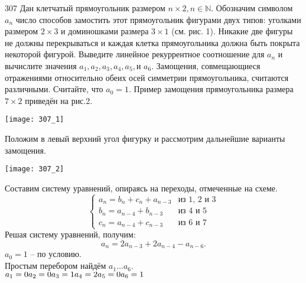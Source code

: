 \begin{task}{307}
Дан клетчатый прямоугольник размером $n\times 2, n\in \mathbb{N}$. Обозначим символом $a_n$ число способов замостить этот прямоугольник фигурами двух типов: уголками размером $2\times 3$ и доминошками размера $3\times 1$ (см. рис. 1). Никакие две фигуры не должны перекрываться и каждая клетка прямоугольника должна быть покрыта некоторой фигурой. Выведите линейное рекуррентное соотношение для $a_n$ и вычислите значения $a_1,  a_2, a_3, a_4, a_5, \text{и } a_6$. Замощения, совмещающиеся отражениями относительно обеих осей симметрии прямоугольника, считаются различными. Считайте, что $a_0=1$. Пример замощения прямоугольника размера $7\times 2$ приведён на рис.2.
\begin{center}
  \texttt{[image: 307\_1]}
\end{center}
\end{task}

\begin{solution}
Положим в левый верхний угол фигурку и рассмотрим дальнейшие варианты замощения.
\begin{center}
  \texttt{[image: 307\_2]}
\end{center}
Составим систему уравнений, опираясь на переходы, отмеченные на схеме.
\[
\begin{cases}
    a_n=b_n+c_n+a_{n-3} &\text{из 1, 2 и 3}\\
    b_n =a_{n-4}+b_{n-3} &\text{из 4 и 5}\\
    c_n =a_{n-4}+c_{n-3} &\text{из 6 и 7}
\end{cases}
\]
Решая систему уравнений, получим:
\[a_n=2a_{n-3}+2a_{n-4}-a_{n-6}.\]
$a_0=1$ -- по условию.\\
Простым перебором найдём $a_1 \dots a_6.$\\
$a_1=0\\
a_2=0\\
a_3=1\\
a_4=2\\
a_5=0\\
a_6=1\\$
\end{solution}